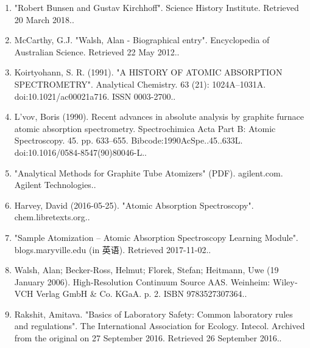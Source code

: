 \begin{enumerate}
\item "Robert Bunsen and Gustav Kirchhoff". Science History Institute. Retrieved 20 March 2018..
\item McCarthy, G.J. "Walsh, Alan - Biographical entry". Encyclopedia of Australian Science. Retrieved 22 May 2012..
\item Koirtyohann, S. R. (1991). "A HISTORY OF ATOMIC ABSORPTION SPECTROMETRY". Analytical Chemistry. 63 (21): 1024A–1031A. doi:10.1021/ac00021a716. ISSN 0003-2700..
\item L'vov, Boris (1990). Recent advances in absolute analysis by graphite furnace atomic absorption spectrometry. Spectrochimica Acta Part B: Atomic Spectroscopy. 45. pp. 633–655. Bibcode:1990AcSpe..45..633L. doi:10.1016/0584-8547(90)80046-L..
\item "Analytical Methods for Graphite Tube Atomizers" (PDF). agilent.com. Agilent Technologies..
\item Harvey, David (2016-05-25). "Atomic Absorption Spectroscopy". chem.libretexts.org..
\item "Sample Atomization – Atomic Absorption Spectroscopy Learning Module". blogs.maryville.edu (in 英语). Retrieved 2017-11-02..
\item Walsh, Alan; Becker-Ross, Helmut; Florek, Stefan; Heitmann, Uwe (19 January 2006). High-Resolution Continuum Source AAS. Weinheim: Wiley‐VCH Verlag GmbH & Co. KGaA. p. 2. ISBN 9783527307364..
\item Rakshit, Amitava. "Basics of Laboratory Safety: Common laboratory rules and regulations". The International Association for Ecology. Intecol. Archived from the original on 27 September 2016. Retrieved 26 September 2016..
\end{enumerate}

